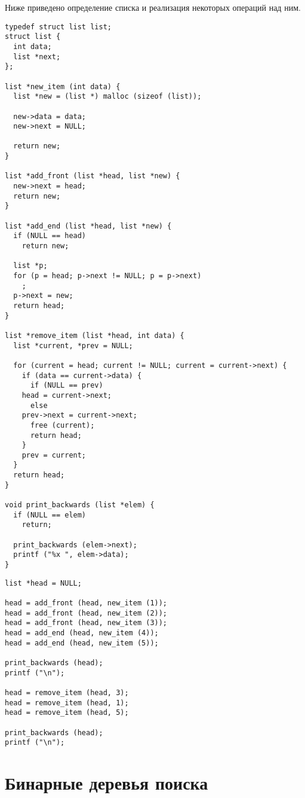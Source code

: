Ниже приведено определение списка и реализация некоторых операций над ним.

\lstset{label=lst:list-impl,caption=Некоторые операции}
\begin{lstlisting}
typedef struct list list;
struct list {
  int data;
  list *next;
};

list *new_item (int data) {
  list *new = (list *) malloc (sizeof (list));

  new->data = data;
  new->next = NULL;

  return new;
}

list *add_front (list *head, list *new) {
  new->next = head;
  return new;
}

list *add_end (list *head, list *new) {
  if (NULL == head)
    return new;

  list *p;
  for (p = head; p->next != NULL; p = p->next)
    ;
  p->next = new;
  return head;
}

list *remove_item (list *head, int data) {
  list *current, *prev = NULL;

  for (current = head; current != NULL; current = current->next) {
    if (data == current->data) {
      if (NULL == prev)
	head = current->next;
      else
	prev->next = current->next;
      free (current);
      return head;
    }
    prev = current;
  }
  return head;
}

void print_backwards (list *elem) {
  if (NULL == elem)
    return;

  print_backwards (elem->next);
  printf ("%x ", elem->data);
}
\end{lstlisting}

\lstset{label=lst:list-usage,caption=Пример использования}
\begin{lstlisting}
list *head = NULL;

head = add_front (head, new_item (1));
head = add_front (head, new_item (2));
head = add_front (head, new_item (3));
head = add_end (head, new_item (4));
head = add_end (head, new_item (5));

print_backwards (head);
printf ("\n");

head = remove_item (head, 3);
head = remove_item (head, 1);
head = remove_item (head, 5);

print_backwards (head);
printf ("\n");
\end{lstlisting}

\section{Бинарные деревья поиска}
\label{sec:trees}

